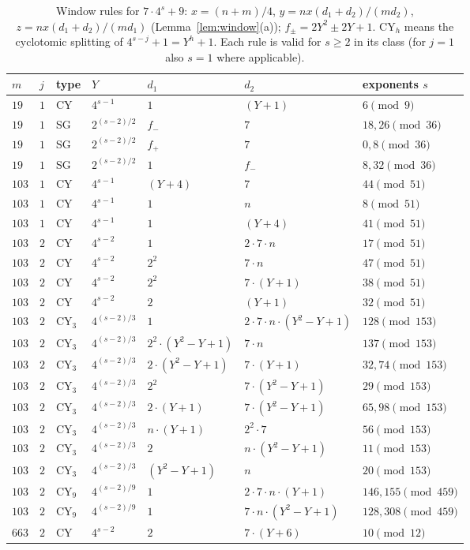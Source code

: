 \documentclass[11pt,reqno]{amsart}
\theoremstyle{definition}
\begin{document}
\begin{table}[ht]
\centering\small
\begin{tabular}{lllllll}
\toprule
$m$ & $j$ & type & $Y$ & $d_1$ & $d_2$ & exponents $s$\\
\midrule
$19$ & $1$ & CY & $4^{s-1}$ & $1$ & $(Y+1)$ & $6\pmod{9}$ \\
$19$ & $1$ & SG & $2^{(s-2)/2}$ & $f_-$ & $7$ & $18,26\pmod{36}$ \\
$19$ & $1$ & SG & $2^{(s-2)/2}$ & $f_+$ & $7$ & $0,8\pmod{36}$ \\
$19$ & $1$ & SG & $2^{(s-2)/2}$ & $1$ & $f_-$ & $8,32\pmod{36}$ \\
$103$ & $1$ & CY & $4^{s-1}$ & $(Y+4)$ & $7$ & $44\pmod{51}$ \\
$103$ & $1$ & CY & $4^{s-1}$ & $1$ & $n$ & $8\pmod{51}$ \\
$103$ & $1$ & CY & $4^{s-1}$ & $1$ & $(Y+4)$ & $41\pmod{51}$ \\
$103$ & $2$ & CY & $4^{s-2}$ & $1$ & $2\cdot 7\cdot n$ & $17\pmod{51}$ \\
$103$ & $2$ & CY & $4^{s-2}$ & $2^{2}$ & $7\cdot n$ & $47\pmod{51}$ \\
$103$ & $2$ & CY & $4^{s-2}$ & $2^{2}$ & $7\cdot (Y+1)$ & $38\pmod{51}$ \\
$103$ & $2$ & CY & $4^{s-2}$ & $2$ & $(Y+1)$ & $32\pmod{51}$ \\
$103$ & $2$ & CY$_{3}$ & $4^{(s-2)/3}$ & $1$ & $2\cdot 7\cdot n\cdot (Y^2-Y+1)$ & $128\pmod{153}$ \\
$103$ & $2$ & CY$_{3}$ & $4^{(s-2)/3}$ & $2^{2}\cdot (Y^2-Y+1)$ & $7\cdot n$ & $137\pmod{153}$ \\
$103$ & $2$ & CY$_{3}$ & $4^{(s-2)/3}$ & $2\cdot (Y^2-Y+1)$ & $7\cdot (Y+1)$ & $32,74\pmod{153}$ \\
$103$ & $2$ & CY$_{3}$ & $4^{(s-2)/3}$ & $2^{2}$ & $7\cdot (Y^2-Y+1)$ & $29\pmod{153}$ \\
$103$ & $2$ & CY$_{3}$ & $4^{(s-2)/3}$ & $2\cdot (Y+1)$ & $7\cdot (Y^2-Y+1)$ & $65,98\pmod{153}$ \\
$103$ & $2$ & CY$_{3}$ & $4^{(s-2)/3}$ & $n\cdot (Y+1)$ & $2^{2}\cdot 7$ & $56\pmod{153}$ \\
$103$ & $2$ & CY$_{3}$ & $4^{(s-2)/3}$ & $2$ & $n\cdot (Y^2-Y+1)$ & $11\pmod{153}$ \\
$103$ & $2$ & CY$_{3}$ & $4^{(s-2)/3}$ & $(Y^2-Y+1)$ & $n$ & $20\pmod{153}$ \\
$103$ & $2$ & CY$_{9}$ & $4^{(s-2)/9}$ & $1$ & $2\cdot 7\cdot n\cdot (Y+1)$ & $146,155\pmod{459}$ \\
$103$ & $2$ & CY$_{9}$ & $4^{(s-2)/9}$ & $1$ & $7\cdot n\cdot (Y^2-Y+1)$ & $128,308\pmod{459}$ \\
$663$ & $2$ & CY & $4^{s-2}$ & $2$ & $7\cdot (Y+6)$ & $10\pmod{12}$ \\
\bottomrule
\end{tabular}
\caption{Window rules for $7\cdot4^s+9$: $x=(n+m)/4$,
$y=nx(d_1+d_2)/(md_2)$, $z=nx(d_1+d_2)/(md_1)$ (Lemma~\ref{lem:window}(a));
$f_\pm=2Y^2\pm2Y+1$.  CY$_h$ means the cyclotomic splitting of
$4^{s-j}+1=Y^h+1$.  Each rule is valid for $s\ge2$ in its class (for
$j=1$ also $s=1$ where applicable).}\label{tab:c7w}
\end{table}
\end{document}
